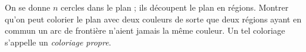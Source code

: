 On se donne $n$ cercles dans le plan ; ils découpent le plan en régions. Montrer qu'on peut colorier le plan avec deux couleurs de sorte que deux régions ayant en commun un arc de frontière n'aient jamais la même couleur. Un tel coloriage s'appelle un \emph{coloriage propre}.
